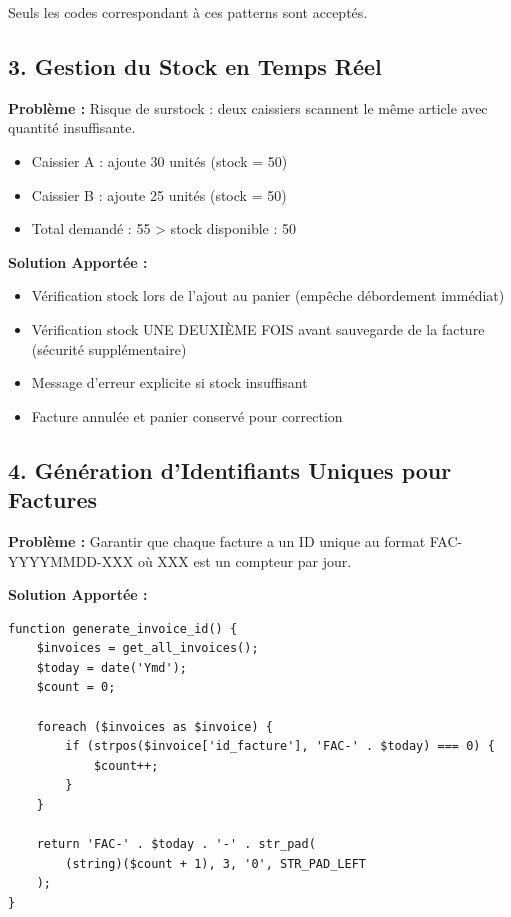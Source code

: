 \documentclass[12pt,a4paper]{report}
\begin{document}
Seuls les codes correspondant à ces patterns sont acceptés.

\subsection{3. Gestion du Stock en Temps Réel}

\textbf{Problème :}
Risque de surstock : deux caissiers scannent le même article avec quantité insuffisante.
\begin{itemize}
    \item Caissier A : ajoute 30 unités (stock = 50)
    \item Caissier B : ajoute 25 unités (stock = 50)
    \item Total demandé : 55 > stock disponible : 50
\end{itemize}

\textbf{Solution Apportée :}
\begin{itemize}
    \item Vérification stock lors de l'ajout au panier (empêche débordement immédiat)
    \item Vérification stock UNE DEUXIÈME FOIS avant sauvegarde de la facture (sécurité supplémentaire)
    \item Message d'erreur explicite si stock insuffisant
    \item Facture annulée et panier conservé pour correction
\end{itemize}

\subsection{4. Génération d'Identifiants Uniques pour Factures}

\textbf{Problème :}
Garantir que chaque facture a un ID unique au format FAC-YYYYMMDD-XXX où XXX est un compteur par jour.

\textbf{Solution Apportée :}
\begin{lstlisting}
function generate_invoice_id() {
    $invoices = get_all_invoices();
    $today = date('Ymd');
    $count = 0;
    
    foreach ($invoices as $invoice) {
        if (strpos($invoice['id_facture'], 'FAC-' . $today) === 0) {
            $count++;
        }
    }
    
    return 'FAC-' . $today . '-' . str_pad(
        (string)($count + 1), 3, '0', STR_PAD_LEFT
    );
}
\end{lstlisting}
\end{document}
